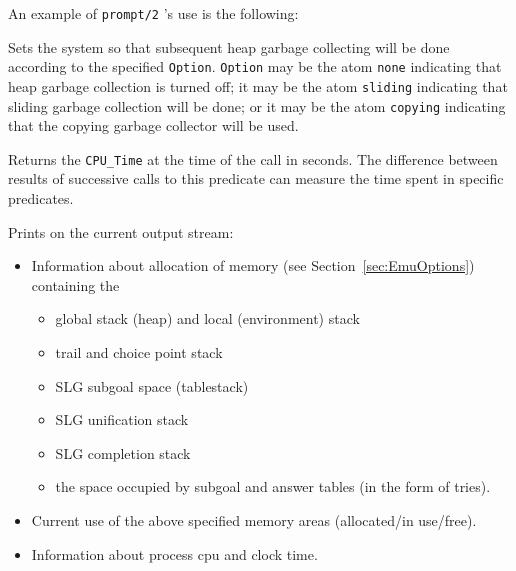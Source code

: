 \begin{description}
    An example of {\tt prompt/2} 's use is the following:


    Sets the system so that subsequent heap garbage collecting will be
    done according to the specified {\tt Option}.  {\tt Option} may be
    the atom \verb|none| indicating that heap garbage collection is
    turned off; it may be the atom \verb|sliding| indicating that
    sliding garbage collection will be done; or it may be the atom
    \verb|copying| indicating that the copying garbage collector will
    be used.
 
    Returns the {\tt CPU\_Time} at the time of the call in seconds.
    The difference between results of successive calls to this
    predicate can measure the time spent in specific predicates.

    Prints on the current output stream:
    \begin{itemize}
    \item Information about allocation of memory 
	  (see Section~\ref{sec:EmuOptions}) containing the 
          \begin{itemize}
          \item global stack (heap) and local (environment) stack
          \item trail and choice point stack
	  \item SLG subgoal space (tablestack)
          \item SLG unification stack
          \item SLG completion stack
	  \item the space occupied by subgoal and answer tables
		(in the form of tries).
          \end{itemize}
    \item Current use of the above specified memory areas
		(allocated/in use/free).
    \item Information about process cpu and clock time.
    \end{itemize}


\end{description}
